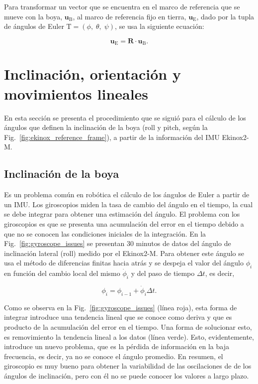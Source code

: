 \documentclass[11pt]{article}
\begin{document}
Para transformar un vector que se encuentra en el marco de referencia que se
mueve con la boya, $\mathbf{u}_\mathrm{B}$, al marco de referencia fijo en
tierra, $\mathbf{u}_\mathrm{E}$, dado por la tupla de ángulos de Euler
$\mathrm{T} = (\phi, \; \theta, \; \psi)$, se usa la siguiente ecuación:

\begin{equation}
  \mathbf{u}_\mathrm{E} = \mathbf{R} \cdot \mathbf{u}_\mathrm{B}.
\end{equation}






\section{Inclinación, orientación y movimientos lineales}

En esta sección se presenta el procedimiento que se siguió para el cálculo de
los ángulos que definen la inclinación de la boya (roll y pitch, según la
Fig.~\ref{fig:ekinox_reference_frame}), a partir de la información del IMU
Ekinox2-M.


\subsection{Inclinación de la boya}

Es un problema común en robótica el cálculo de los ángulos de Euler a partir de
un IMU. Los giroscopios miden la tasa de cambio del ángulo en el tiempo, la cual
se debe integrar para obtener una estimación del ángulo. El problema con los
giroscopios es que se presenta una acumulación del error en el tiempo debido a
que no se conocen las condiciones iniciales de la integración. En la
Fig.~\ref{fig:gyroscope_issues} se presentan 30 minutos de datos del ángulo de
inclinación lateral (roll) medido por el Ekinox2-M. Para obtener este ángulo se
usa el método de diferencias finitas hacia atrás y se despeja el valor del
ángulo $\phi_i$ en función del cambio local del mismo $\dot{\phi}_i$ y del paso
de tiempo $\Delta t$, es decir,

\begin{equation}
  \phi_i = \phi_{i-1} + \dot{\phi}_i \Delta t.
\end{equation}

Como se observa en la Fig.~\ref{fig:gyroscope_issues} (línea roja), esta forma
de integrar introduce una tendencia lineal que se conoce como deriva y que es
producto de la acumulación del error en el tiempo. Una forma de solucionar esto,
es removimiento la tendencia lineal a los datos (línea verde). Esto,
evidentemente, introduce un nuevo problema, que es la pérdida de información en
la baja frecuencia, es decir, ya no se conoce el ángulo promedio.  En resumen,
el giroscopio es muy bueno para obtener la variabilidad de las oscilaciones de
de los ángulos de inclinación, pero con él no se puede conocer los valores a
largo plazo.
\end{document}
